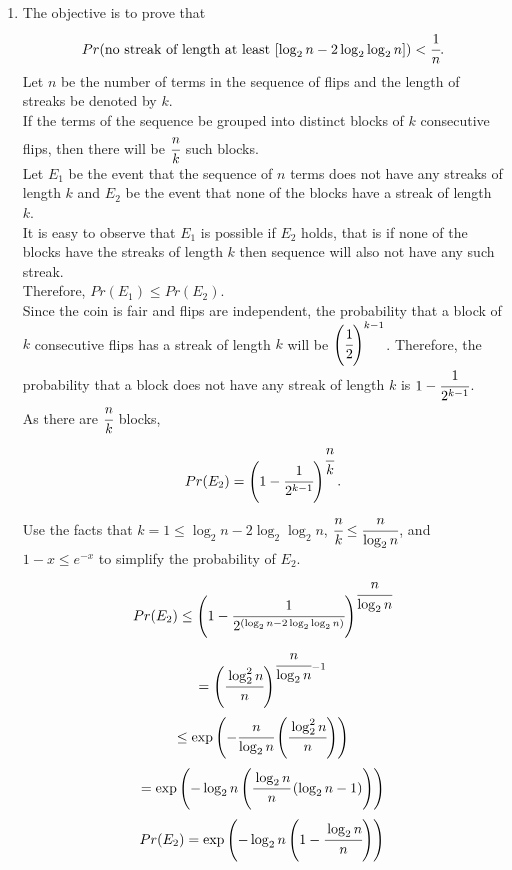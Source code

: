 \documentclass{article}
\begin{document}
\begin{enumerate}
\begin{enumerate}
        \item 
            The objective is to prove that
            \[
                Pr(\text{no streak of length at least } [\log_2 n - 2\log_2\log_2 n]) < \cfrac{1}{n}.
            \]            
            Let \(n\) be the number of terms in the sequence of flips and the length of streaks be denoted by \(k\).\\            
            If the terms of the sequence be grouped into distinct blocks of \(k\) consecutive flips, then there will be \(\cfrac{n}{k}\) such blocks.\\            
            Let \(E_1\) be the event that the sequence of \(n\) terms does not have any streaks of length \(k\) and \(E_2\) be the event that none of the blocks have a streak of length \(k\).\\
            It is easy to observe that \(E_1\) is possible if \(E_2\) holds, that is if none of the blocks have the streaks of length \(k\) then sequence will also not have any such streak.\\
            Therefore, \(Pr(E_1) \leq Pr(E_2)\).\\            
            Since the coin is fair and flips are independent, the probability that a block of \( k \) consecutive flips has a streak of length \( k \) will be \( \left(\cfrac{1}{2}\right)^{k-1} \). Therefore, the probability that a block does not have any streak of length \( k \) is \( 1 - \cfrac{1}{2^{k-1}} \).\\
            As there are \( \cfrac{n}{k} \) blocks,
            \[
                Pr(E_2) = \left(1 - \cfrac{1}{2^{k-1}}\right)^{\cfrac{n}{k}}.
            \]            
            Use the facts that \( k = 1 \leq \log_2 n - 2\log_2\log_2 n \), \( \cfrac{n}{k} \leq \cfrac{n}{\log_2 n} \), and \( 1 - x \leq e^{-x} \) to simplify the probability of \( E_2 \).            
            \[
                Pr(E_2) \leq \left(1 - \cfrac{1}{2^{(\log_2 n - 2\log_2\log_2 n)}}\right)^{\cfrac{n}{\log_2 n}}
            \]            
            \[
                = \left(\cfrac{\log_2^2 n}{n}\right)^{\cfrac{n}{\log_2 n}-1}
            \]            
            \[
                \leq \exp\left(-\cfrac{n}{\log_2 n}\left(\cfrac{\log_2^2 n}{n}\right)\right)
            \]            
            \[
                = \exp\left(-\log_2 n \left(\cfrac{\log_2 n}{n} \left(\log_2 n - 1\right)\right)\right)
            \]            
            \[
                Pr(E_2) = \exp\left(-\log_2 n \left(1 - \cfrac{\log_2 n}{n}\right)\right)
            \]            

\end{enumerate}
\end{enumerate}
\end{document}
